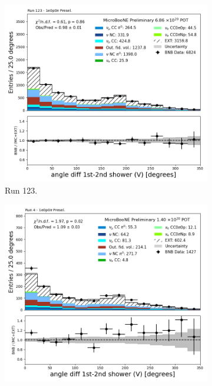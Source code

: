 \begin{figure}[H]
    \centering
    \begin{subfigure}[t]{0.32\linewidth}
        \includegraphics[width=\linewidth]{technote/Appendix_Preselection/Figures/1e0p0pi/Run123/anglediff_V_Run123_1e0p0pi_Presel.png}
        \caption{Run 123.}
    \end{subfigure}%
    \hspace{0.2cm}%
    \begin{subfigure}[t]{0.32\linewidth}
        \includegraphics[width=\linewidth]{technote/Appendix_Preselection/Figures/1e0p0pi/Run4b/anglediff_V_Run4b_1e0p0pi_Presel.png}

\end{subfigure}
\end{figure}

